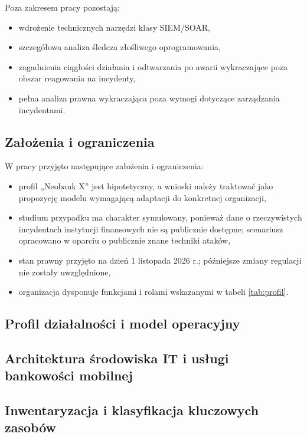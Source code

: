 Poza zakresem pracy pozostają:
\begin{itemize}
    \item wdrożenie technicznych narzędzi klasy SIEM/SOAR,
    \item szczegółowa analiza śledcza złośliwego oprogramowania,
    \item zagadnienia ciągłości działania i odtwarzania po awarii wykraczające poza obszar reagowania na incydenty,
    \item pełna analiza prawna wykraczająca poza wymogi dotyczące zarządzania incydentami.
\end{itemize}

\subsection{Założenia i ograniczenia}

W pracy przyjęto następujące założenia i ograniczenia:
\begin{itemize}
    \item profil „Neobank X” jest hipotetyczny, a wnioski należy traktować jako propozycję modelu wymagającą adaptacji do konkretnej organizacji,
    \item studium przypadku ma charakter symulowany, ponieważ dane o rzeczywistych incydentach instytucji finansowych nie są publicznie dostępne; scenariusz opracowano w oparciu o publicznie znane techniki ataków,
    \item stan prawny przyjęto na dzień 1 listopada 2026 r.; późniejsze zmiany regulacji nie zostały uwzględnione,
    \item organizacja dysponuje funkcjami i rolami wskazanymi w tabeli \ref{tab:profil}.
\end{itemize}


\subsection{Profil działalności i model operacyjny}\label{subsec:profil-dzialalnosci}

\subsection{Architektura środowiska IT i usługi bankowości mobilnej}\label{subsec:architektura-srodowiska}

\subsection{Inwentaryzacja i klasyfikacja kluczowych zasobów}\label{subsec:kluczowe-zasoby}
